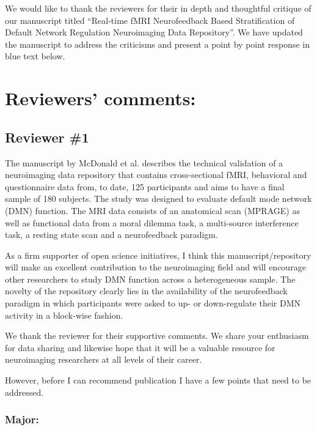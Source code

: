 \documentclass{article}
\newcommand{\RESPONSE}[1]{\textcolor{responseblue}{#1}}
\begin{document}
\sffamily

We would like to thank the reviewers for their in depth and thoughtful critique of our manuscript titled ``Real-time fMRI Neurofeedback Based Stratification of Default Network Regulation Neuroimaging Data Repository''. We have updated the manuscript to address the criticisms and present a point by point response in \RESPONSE{blue text} below.

\section*{Reviewers' comments:}

\subsection*{Reviewer \#1} 

The manuscript by McDonald et al. describes the technical validation of a neuroimaging data repository that contains cross-sectional fMRI, behavioral and questionnaire data from, to date, 125 participants and aims to have a final sample of 180 subjects. The study was designed to evaluate default mode network (DMN) function. The MRI data consists of an anatomical scan (MPRAGE) as well as functional data from a moral dilemma task, a multi-source interference task, a resting state scan and a neurofeedback paradigm.

As a firm supporter of open science initiatives, I think this manuscript/repository will make an excellent contribution to the neuroimaging field and will encourage other researchers to study DMN function across a heterogeneous sample. The novelty of the repository clearly lies in the availability of the neurofeedback paradigm in which participants were asked to up- or down-regulate their DMN activity in a block-wise fashion.

\RESPONSE{We thank the reviewer for their supportive comments. We share your enthusiasm for data sharing and likewise hope that it will be a valuable resource for neuroimaging researchers at all levels of their career.}

However, before I can recommend publication I have a few points that need to be addressed.

\subsubsection*{Major:}
\end{document}
